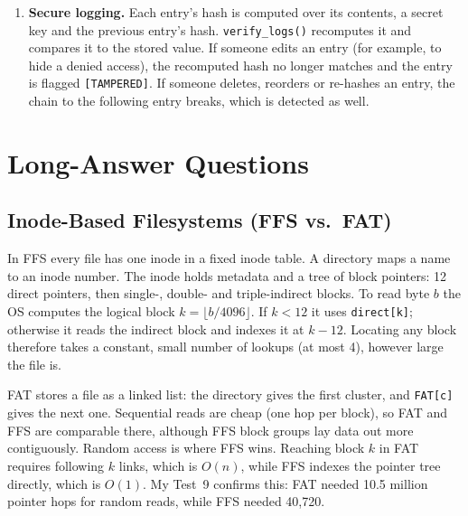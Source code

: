 \documentclass[11pt]{article}
\begin{document}
\begin{enumerate}[leftmargin=*]
\item \textbf{Secure logging.} Each entry's hash is computed over its
  contents, a secret key and the previous entry's hash.
  \texttt{verify\_logs()} recomputes it and compares it to the stored value.
  If someone edits an entry (for example, to hide a denied access), the
  recomputed hash no longer matches and the entry is flagged
  \texttt{[TAMPERED]}. If someone deletes, reorders or re-hashes an entry,
  the chain to the following entry breaks, which is detected as well.
\end{enumerate}

\section{Long-Answer Questions}
\subsection{Inode-Based Filesystems (FFS vs.\ FAT)}
In FFS every file has one inode in a fixed inode table. A directory maps a
name to an inode number. The inode holds metadata and a tree of block
pointers: 12 direct pointers, then single-, double- and triple-indirect
blocks. To read byte $b$ the OS computes the logical block $k=\lfloor
b/4096\rfloor$. If $k<12$ it uses \texttt{direct[k]}; otherwise it reads the
indirect block and indexes it at $k-12$. Locating any block therefore takes
a constant, small number of lookups (at most 4), however large the file is.

FAT stores a file as a linked list: the directory gives the first cluster,
and \texttt{FAT[c]} gives the next one. Sequential reads are cheap (one hop
per block), so FAT and FFS are comparable there, although FFS block groups
lay data out more contiguously. Random access is where FFS wins. Reaching
block $k$ in FAT requires following $k$ links, which is $O(n)$, while FFS
indexes the pointer tree directly, which is $O(1)$. My Test~9 confirms
this: FAT needed 10.5 million pointer hops for random reads, while FFS
needed 40{,}720.
\end{document}
